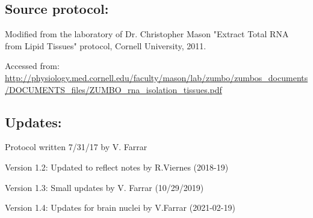 \documentclass[a4paper,12pt,twoside]{book}
\begin{document}
\begin{enumerate}
 \subsection*{Source protocol:}	
	Modified from the laboratory of Dr. Christopher Mason "Extract Total RNA from Lipid Tissues" protocol, Cornell University, 2011.
	
	Accessed from: \url{http://physiology.med.cornell.edu/faculty/mason/lab/zumbo/zumbos_documents/DOCUMENTS_files/ZUMBO_rna_isolation_tissues.pdf}

 \subsection*{Updates:}
 Protocol written 7/31/17 by V. Farrar
 
 Version 1.2: Updated to reflect notes by R.Viernes (2018-19)
 
 Version 1.3: Small updates by V. Farrar (10/29/2019)
 
 Version 1.4: Updates for brain nuclei by V.Farrar (2021-02-19)
	
\end{enumerate}
\end{document}
